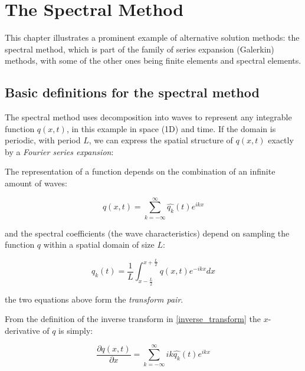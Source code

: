 \chapter{The Spectral Method}

This chapter illustrates a prominent example of alternative solution methods: the spectral method, which is part of the family of series expansion (Galerkin) methods, with some of the other ones being finite elements and spectral elements.

\section{Basic definitions for the spectral method}
The spectral method uses decomposition into waves to represent any integrable function $q(x,t)$, in this example in space (1D) and time. If the domain is periodic, with period $L$, we can express the spatial structure of $q(x,t)$ exactly by a \emph{Fourier series expansion}:

\begin{definition}
The representation of a function depends on the combination of an infinite amount of waves:
	
	\begin{equation}
	q(x,t)=\sum_{k=-\infty}^{\infty} \widehat{q_k}(t)e^{ikx}
	\label{inverse_transform}
	\end{equation}

and the spectral coefficients (the wave characteristics) depend on sampling the function $q$ within a spatial domain of size $L$:

\begin{equation}
	\widehat{q_k}(t)=  \frac{1}{L}  \int_{x-\frac{L}{2}}^{x+\frac{L}{2}} q(x,t) e^{-ikx} dx
	\label{fourier_transform}
\end{equation}

the two equations above form the \emph{transform pair}.
\end{definition}

\clearpage
From the definition of the inverse transform in \ref{inverse_transform} the $x$-derivative of $q$ is simply:

\begin{equation}
	\frac{\partial	q(x,t)} {\partial x} = \sum_{k=-\infty}^{\infty} ik \widehat{q_k}(t)e^{ikx}
	\label{exact_gradient}
\end{equation}

